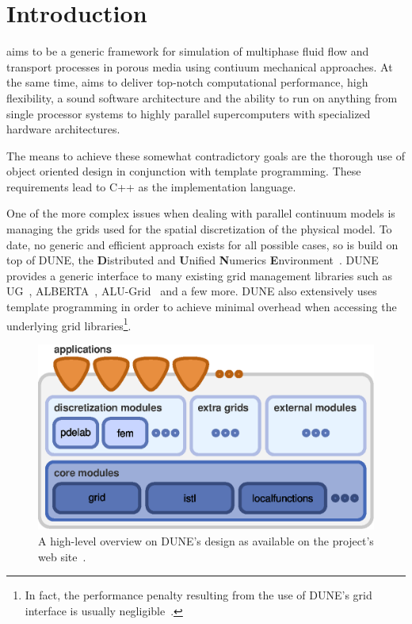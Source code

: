 \chapter{Introduction}

\Dumux aims to be a generic framework for simulation of multiphase
fluid flow and transport processes in porous media using contiuum
mechanical approaches.  At the same time, \Dumux aims to deliver
top-notch computational performance, high flexibility, a sound
software architecture and the ability to run on anything from single
processor systems to highly parallel supercomputers with specialized
hardware architectures.

The means to achieve these somewhat contradictory goals are the
thorough use of object oriented design in conjunction with template
programming. These requirements lead to C++ as the implementation
language.

One of the more complex issues when dealing with parallel continuum
models is managing the grids used for the spatial discretization of
the physical model. To date, no generic and efficient approach exists
for all possible cases, so \Dumux is build on top of DUNE, the
\textbf{D}istributed and \textbf{U}nified \textbf{N}umerics
\textbf{E}nvironment~\cite{DUNE-HP}. DUNE provides a generic interface
to many existing grid management libraries such as UG~\cite{UG-HP},
ALBERTA~\cite{ALBERTA-HP}, ALU-Grid~\cite{ALUGRID-HP} and a few
more. DUNE also extensively uses template programming in order to
achieve minimal overhead when accessing the underlying grid
libraries\footnote{In fact, the performance penalty resulting from the
  use of DUNE's grid interface is usually
  negligible~\cite{BURRI2006}.}.
\begin{figure}[hbt]
  \centering 
  \includegraphics[width=.5\linewidth, keepaspectratio]{EPS/dunedesign}
  \caption{
    \label{fig:dune-design}
    A high-level overview on DUNE's design as available on the project's
    web site~\cite{DUNE-HP}.
  }
\end{figure}

